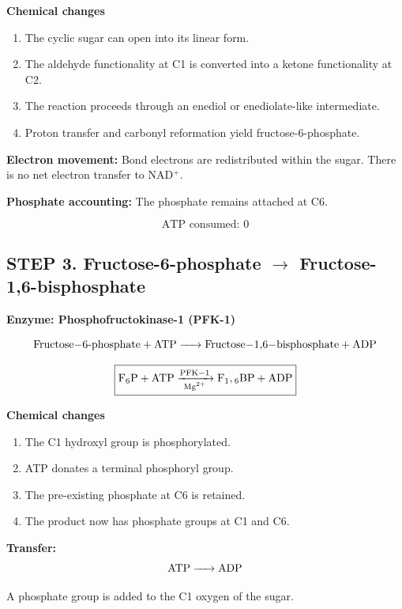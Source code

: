 \documentclass[10pt,a4paper,landscape]{article}
\begin{document}
\textbf{Chemical changes}

\begin{enumerate}
  \item The cyclic sugar can open into its linear form.
  \item The aldehyde functionality at C1 is converted into a
  ketone functionality at C2.
  \item The reaction proceeds through an enediol or
  enediolate-like intermediate.
  \item Proton transfer and carbonyl reformation yield
  fructose-6-phosphate.
\end{enumerate}

\textbf{Electron movement:} Bond electrons are redistributed
within the sugar. There is no net electron transfer to NAD$^+$.

\textbf{Phosphate accounting:} The phosphate remains attached at C6.

\[
\boxed{\text{ATP consumed: 0}}
\]


\subsection*{STEP 3. Fructose-6-phosphate $\rightarrow$ Fructose-1,6-bisphosphate}

\textcolor{enz}{\textbf{Enzyme: Phosphofructokinase-1 (PFK-1)}}

\[
\ce{
Fructose-6-phosphate + ATP
-> Fructose-1,6-bisphosphate + ADP
}
\]

\begin{center}
\[
\boxed{
\ce{F6P + ATP ->[PFK-1][Mg^{2+}] F1,6BP + ADP}
}
\]
\end{center}

\textbf{Chemical changes}

\begin{enumerate}
  \item The C1 hydroxyl group is phosphorylated.
  \item ATP donates a terminal phosphoryl group.
  \item The pre-existing phosphate at C6 is retained.
  \item The product now has phosphate groups at C1 and C6.
\end{enumerate}

\textcolor{phos}{\textbf{Transfer:}}
\[
\ce{ATP -> ADP}
\]

A phosphate group is added to the C1 oxygen of the sugar.
\end{document}
